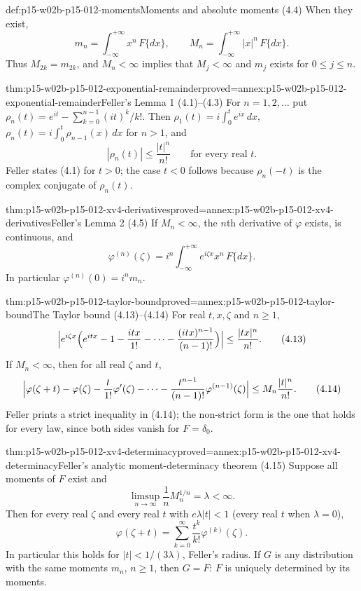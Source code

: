 \begin{hbdefinition}{def:p15-w02b-p15-012-moments}{Moments and absolute moments (4.4)}
When they exist,
\[
 m_n=\int_{-\infty}^{+\infty}x^n\,F\{dx\},\qquad
 M_n=\int_{-\infty}^{+\infty}|x|^n\,F\{dx\}.
 \tag{4.4}
\]
Thus \(M_{2k}=m_{2k}\), and \(M_n<\infty\) implies that \(M_j<\infty\) and
\(m_j\) exists for \(0\leq j\leq n\).
\end{hbdefinition}

\begin{hblemma}{thm:p15-w02b-p15-012-exponential-remainder}{proved=annex:p15-w02b-p15-012-exponential-remainder}{Feller's Lemma 1 (4.1)--(4.3)}
For \(n=1,2,\ldots\) put
\(\rho_n(t)=e^{it}-\sum_{k=0}^{n-1}(it)^k/k!\). Then
\(\rho_1(t)=i\int_0^te^{ix}\,dx\),
\(\rho_n(t)=i\int_0^t\rho_{n-1}(x)\,dx\) for \(n>1\), and
\[
 |\rho_n(t)|\leq\frac{|t|^n}{n!}\qquad\text{for every real }t .
 \tag{4.1}
\]
Feller states (4.1) for \(t>0\); the case \(t<0\) follows because
\(\rho_n(-t)\) is the complex conjugate of \(\rho_n(t)\).
\end{hblemma}

\begin{hblemma}{thm:p15-w02b-p15-012-xv4-derivatives}{proved=annex:p15-w02b-p15-012-xv4-derivatives}{Feller's Lemma 2 (4.5)}
If \(M_n<\infty\), the \(n\)th derivative of \(\varphi\) exists, is continuous,
and
\[
 \varphi^{(n)}(\zeta)=i^n\int_{-\infty}^{+\infty}e^{i\zeta x}x^n\,F\{dx\}.
 \tag{4.5}
\]
In particular \(\varphi^{(n)}(0)=i^nm_n\).
\end{hblemma}

\begin{hbtheorem}{thm:p15-w02b-p15-012-taylor-bound}{proved=annex:p15-w02b-p15-012-taylor-bound}{The Taylor bound (4.13)--(4.14)}
For real \(t,x,\zeta\) and \(n\geq1\),
\[
 \Bigl|e^{i\zeta x}\Bigl(e^{itx}-1-\frac{itx}{1!}-\cdots
        -\frac{(itx)^{n-1}}{(n-1)!}\Bigr)\Bigr|\leq\frac{|tx|^n}{n!}.
 \tag{4.13}
\]
If \(M_n<\infty\), then for all real \(\zeta\) and \(t\),
\[
 \Bigl|\varphi(\zeta+t)-\varphi(\zeta)-\frac t{1!}\varphi'(\zeta)-\cdots
     -\frac{t^{n-1}}{(n-1)!}\varphi^{(n-1)}(\zeta)\Bigr|
   \leq M_n\frac{|t|^n}{n!}.
 \tag{4.14}
\]
Feller prints a strict inequality in (4.14); the non-strict form is the one
that holds for every law, since both sides vanish for \(F=\delta_0\).
\end{hbtheorem}

\begin{hbtheorem}{thm:p15-w02b-p15-012-xv4-determinacy}{proved=annex:p15-w02b-p15-012-xv4-determinacy}{Feller's analytic moment-determinacy theorem (4.15)}
Suppose all moments of \(F\) exist and
\[
 \limsup_{n\to\infty}\frac1nM_n^{1/n}=\lambda<\infty .
 \tag{4.15}
\]
Then for every real \(\zeta\) and every real \(t\) with \(e\lambda|t|<1\)
(every real \(t\) when \(\lambda=0\)),
\[
 \varphi(\zeta+t)=\sum_{k=0}^\infty\frac{t^k}{k!}\varphi^{(k)}(\zeta).
\]
In particular this holds for \(|t|<1/(3\lambda)\), Feller's radius.
If \(G\) is any distribution with the same moments
\(m_n\), \(n\geq1\), then \(G=F\): \(F\) is uniquely determined by its moments.
\end{hbtheorem}

